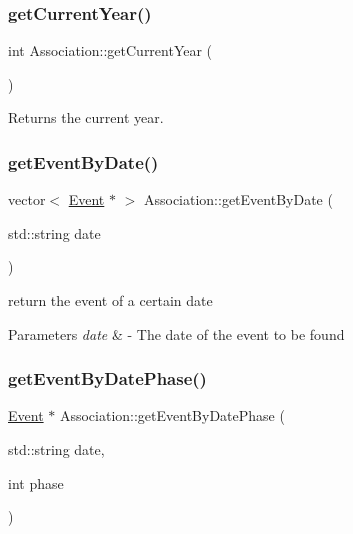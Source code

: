\subsubsection{\texorpdfstring{get\+Current\+Year()}{getCurrentYear()}}
{\footnotesize\ttfamily int Association\+::get\+Current\+Year (\begin{DoxyParamCaption}{ }\end{DoxyParamCaption})\hspace{0.3cm}{\ttfamily [static]}}



Returns the current year. 

\mbox{\label{classAssociation_af5a5354a9e84e8441f0bda694966d834}} 
\subsubsection{\texorpdfstring{get\+Event\+By\+Date()}{getEventByDate()}}
{\footnotesize\ttfamily vector$<$ \mbox{\hyperlink{classEvent}{Event}} $\ast$ $>$ Association\+::get\+Event\+By\+Date (\begin{DoxyParamCaption}\item[{std\+::string}]{date }\end{DoxyParamCaption})}



return the event of a certain date 


\begin{DoxyParams}{Parameters}
{\em date} & -\/ The date of the event to be found \\
\hline
\end{DoxyParams}
\mbox{\label{classAssociation_af7345aeb4b38410261527c2f170ad707}} 
\subsubsection{\texorpdfstring{get\+Event\+By\+Date\+Phase()}{getEventByDatePhase()}}
{\footnotesize\ttfamily \mbox{\hyperlink{classEvent}{Event}} $\ast$ Association\+::get\+Event\+By\+Date\+Phase (\begin{DoxyParamCaption}\item[{std\+::string}]{date,  }\item[{int}]{phase }\end{DoxyParamCaption})}



